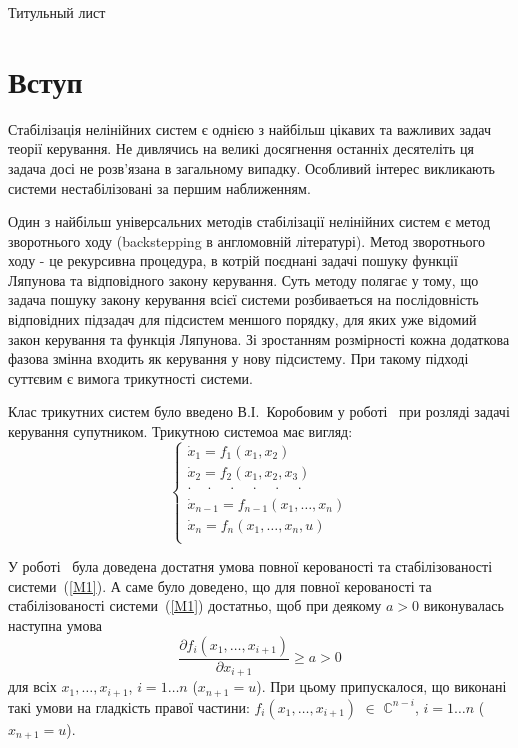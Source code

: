 \documentclass{article}
\begin{document}
Титульный лист
\pagebreak
\tableofcontents
\pagebreak

\section{Вступ}

Стабілізація нелінійних систем є однією з найбільш цікавих та важливих задач теорії керування.
Не дивлячись на великі досягнення останніх десятеліть ця задача досі не розв'язана в 
загальному випадку. Особливий інтерес викликають системи нестабілізовані за першим
наближенням. 

Один з найбільш універсальних методів стабілізації нелінійних систем є метод зворотнього ходу 
(backstepping в англомовній літературі). Метод зворотнього ходу - це рекурсивна процедура, в котрій поєднані задачі пошуку функції Ляпунова та відповідного закону
керування. Суть методу полягає у тому, що задача пошуку закону керування всієї системи розбиваеться на послідовність
відповідних підзадач для підсистем меншого порядку, для яких уже відомий закон керування та функція Ляпунова.
Зі зростанням розмірності кожна додаткова фазова змінна входить як керування у нову підсистему. 
При такому підході суттєвим є вимога трикутності системи.

Клас трикутних систем було введено В.І.~Коробовим у роботі~\cite{Korobov} при розляді задачі
керування супутником.
Трикутною системоа має вигляд: 
\begin{equation}\label{M1}
	\begin{cases}
        \dot x_1 = f_1(x_1, x_2)\\
        \dot x_2 = f_2(x_1, x_2 ,x_3)\\
        \cdot \quad \cdot \quad \cdot \quad \cdot \quad \cdot \quad \cdot \quad\\
        \dot x_{n-1} = f_{n-1}(x_1, \dots ,x_n)\\
        \dot x_{n} = f_{n}(x_1, \dots ,x_n,u)\\
	\end{cases}
\end{equation}

У роботі~\cite{?} була доведена достатня умова повної керованості та стабілізованості
системи~(\ref{M1}). А саме було доведено, що для повної керованості та стабілізованості
системи~(\ref{M1}) достатньо, щоб при деякому $a>0$ виконувалась наступна
умова 
\begin{equation}\label{M2}
    \frac{\partial f_i(x_1,\dots,x_{i+1})}{\partial x_{i+1}} \geq a > 0 
\end{equation} 
для всіх $x_1, \dots, x_{i+1}$, $i=1 \dots n $ ($x_{n+1} = u$). При цьому 
припускалося, що виконані такі умови на гладкість правої частини: 
$ f_i(x_1,\dots,x_{i+1})$ $\in$ $\mathbb{C}^{n-i}$, $i=1 \dots n $ ($x_{n+1} = u$).
\end{document}
